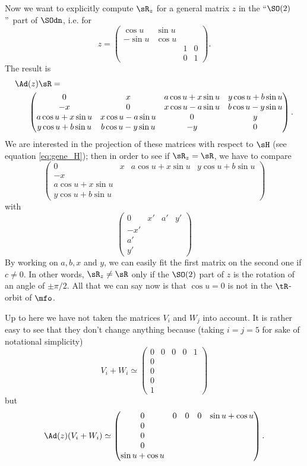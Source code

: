 Now we want to explicitly compute $\sR_z$ for a general matrix $z$ in the ``$\SO(2)$''\ part of $\SOdn$, i.e. for
\[
   z=
\begin{pmatrix}
  \cos u  & \sin u \\
  -\sin u & \cos u \\
    &  & 1  & 0\\
    &  & 0  & 1
 \end{pmatrix}.
\]
The result is
\begin{equation}
\begin{split}
  \Ad&(z)\sR=\\
&\begin{pmatrix}
  0      & x      & a\cos u+x\sin u & y\cos u+b\sin u\\
  -x     & 0      & x\cos u-a\sin u & b\cos u-y\sin u\\
  a\cos u+x\sin u   & x\cos u -a\sin u &   0   & y\\
  y\cos u+b\sin u  & b\cos u-y\sin u &   -y  & 0
 \end{pmatrix}.
\end{split}
\end{equation}
We are interested in the projection of these matrices with respect to $\sH$ (see equation \eqref{eq:gene_H}); then in order to see if $\sR_z=\sR$, we have to compare
\[
\begin{pmatrix}
  0      & x & a\cos u+x\sin u & y\cos u+b\sin u\\
  -x     &  &        & \\
  a\cos u+x\sin u  &  &        & \\
  y \cos u+b\sin u  &  &        &
 \end{pmatrix}
\]
with
\[
\begin{pmatrix}
  0  & x' & a'& y'\\
  -x' &  &  & \\
  a'  &  &  & \\
  y'  &  &  &
 \end{pmatrix}
\]
By working on $a,b,x$ and $y$, we can easily fit the first matrix on the second
one if $c\neq 0$. In other words, $\sR_z\neq\sR$ only if the $\SO(2)$
part of $z$ is the rotation of an angle of $\pm\pi/2$. All that we can say now is that $\cos u=0$ is  not in the $\tR$-orbit of $\mfo$.

Up to here we have not taken the matrices $V_i$ and $W_j$ into account. It is rather easy to see that they don't change anything because (taking $i=j=5$ for sake of notational simplicity)
\[
  V_i+W_i\simeq
\begin{pmatrix}
0&0&0&0&1\\
0\\
0\\
0\\
1
\end{pmatrix}
\]
but
\[
  \Ad(z)(V_i+W_i)\simeq
\begin{pmatrix}
0&0&0&0&\sin u+\cos u\\
0\\
0\\
0\\
\sin u+\cos u
\end{pmatrix}.
\]

